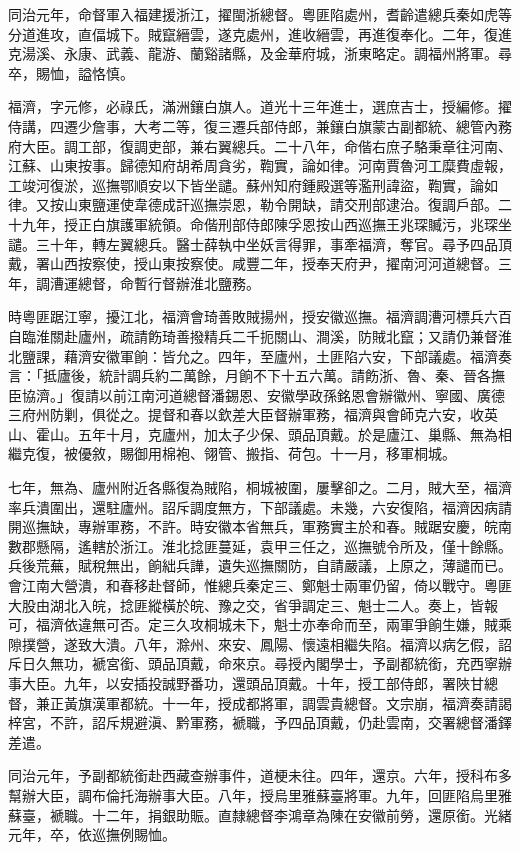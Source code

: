 \begin{pinyinscope}
同治元年，命督軍入福建援浙江，擢閩浙總督。粵匪陷處州，耆齡遣總兵秦如虎等分道進攻，直偪城下。賊竄縉雲，遂克處州，進收縉雲，再進復奉化。二年，復進克湯溪、永康、武義、龍游、蘭谿諸縣，及金華府城，浙東略定。調福州將軍。尋卒，賜恤，謚恪慎。

福濟，字元修，必祿氏，滿洲鑲白旗人。道光十三年進士，選庶吉士，授編修。擢侍講，四遷少詹事，大考二等，復三遷兵部侍郎，兼鑲白旗蒙古副都統、總管內務府大臣。調工部，復調吏部，兼右翼總兵。二十八年，命偕右庶子駱秉章往河南、江蘇、山東按事。歸德知府胡希周貪劣，鞫實，論如律。河南賈魯河工糜費虛報，工竣河復淤，巡撫鄂順安以下皆坐譴。蘇州知府鍾殿選等濫刑諱盜，鞫實，論如律。又按山東鹽運使韋德成訐巡撫崇恩，勒令開缺，請交刑部逮治。復調戶部。二十九年，授正白旗護軍統領。命偕刑部侍郎陳孚恩按山西巡撫王兆琛贓污，兆琛坐譴。三十年，轉左翼總兵。醫士薛執中坐妖言得罪，事牽福濟，奪官。尋予四品頂戴，署山西按察使，授山東按察使。咸豐二年，授奉天府尹，擢南河河道總督。三年，調漕運總督，命暫行督辦淮北鹽務。

時粵匪踞江寧，擾江北，福濟會琦善敗賊揚州，授安徽巡撫。福濟調漕河標兵六百自臨淮關赴廬州，疏請飭琦善撥精兵二千扼關山、澗溪，防賊北竄；又請仍兼督淮北鹽課，藉濟安徽軍餉：皆允之。四年，至廬州，土匪陷六安，下部議處。福濟奏言：「抵廬後，統計調兵約二萬餘，月餉不下十五六萬。請飭浙、魯、秦、晉各撫臣協濟。」復請以前江南河道總督潘錫恩、安徽學政孫銘恩會辦徽州、寧國、廣德三府州防剿，俱從之。提督和春以欽差大臣督辦軍務，福濟與會師克六安，收英山、霍山。五年十月，克廬州，加太子少保、頭品頂戴。於是廬江、巢縣、無為相繼克復，被優敘，賜御用棉袍、翎管、搬指、荷包。十一月，移軍桐城。

七年，無為、廬州附近各縣復為賊陷，桐城被圍，屢擊卻之。二月，賊大至，福濟率兵潰圍出，還駐廬州。詔斥調度無方，下部議處。未幾，六安復陷，福濟因病請開巡撫缺，專辦軍務，不許。時安徽本省無兵，軍務實主於和春。賊踞安慶，皖南數郡懸隔，遙轄於浙江。淮北捻匪蔓延，袁甲三任之，巡撫號令所及，僅十餘縣。兵後荒蕪，賦稅無出，餉絀兵譁，遺失巡撫關防，自請嚴議，上原之，薄譴而已。會江南大營潰，和春移赴督師，惟總兵秦定三、鄭魁士兩軍仍留，倚以戰守。粵匪大股由湖北入皖，捻匪縱橫於皖、豫之交，省爭調定三、魁士二人。奏上，皆報可，福濟依違無可否。定三久攻桐城未下，魁士亦奉命而至，兩軍爭餉生嫌，賊乘隙撲營，遂致大潰。八年，滁州、來安、鳳陽、懷遠相繼失陷。福濟以病乞假，詔斥日久無功，褫宮銜、頭品頂戴，命來京。尋授內閣學士，予副都統銜，充西寧辦事大臣。九年，以安插投誠野番功，還頭品頂戴。十年，授工部侍郎，署陜甘總督，兼正黃旗漢軍都統。十一年，授成都將軍，調雲貴總督。文宗崩，福濟奏請謁梓宮，不許，詔斥規避滇、黔軍務，褫職，予四品頂戴，仍赴雲南，交署總督潘鐸差遣。

同治元年，予副都統銜赴西藏查辦事件，道梗未往。四年，還京。六年，授科布多幫辦大臣，調布倫托海辦事大臣。八年，授烏里雅蘇臺將軍。九年，回匪陷烏里雅蘇臺，褫職。十二年，捐銀助賑。直隸總督李鴻章為陳在安徽前勞，還原銜。光緒元年，卒，依巡撫例賜恤。


\end{pinyinscope}

